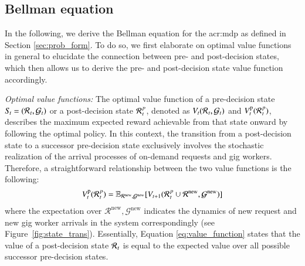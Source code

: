 \subsection{Bellman equation}
\label{sec:bellman}
In the following, we derive the Bellman equation for the \gls{acr:mdp} as defined in Section \ref{sec:prob_form}. To do so, we first elaborate on optimal value functions in general to elucidate the connection between pre- and post-decision states, which then allows us to derive the pre- and post-decision state value function accordingly. 

\noindent \textit{Optimal value functions:} The optimal value function of a pre-decision state $S\hspace{-0.1em}_t = (\mathcal{R}\hspace{0.05em}_{t},\mathcal{G}_t)$ or a post-decision state $\mathcal{R}\hspace{0.05em}_t^{p}$, denoted as $V_t(\mathcal{R}\hspace{0.05em}_{t},\mathcal{G}_t)$ and $V^{\mathrm{p}}_{t}(\mathcal{R}\hspace{0.05em}_{t}^{p})$, describes the maximum expected reward achievable from that state onward by following the optimal policy. In this context, the transition from a post-decision state to a successor pre-decision state exclusively involves the stochastic realization of the arrival processes of on-demand requests and gig workers. Therefore, a straightforward relationship between the two value functions is the following: 
\begin{align}
V^{\mathrm{p}}_{t}(\mathcal{R}\hspace{0.05em}_t^{p}) = \mathbb{E}_{\mathcal{R}^{\mathrm{new}},\mathcal{G}^{\mathrm{new}}}[V_{t+1}(\mathcal{R}\hspace{0.05em}_t^{p} \cup \mathcal{R}^{\mathrm{new}},\mathcal{G}^{\mathrm{new}})] \label{eq:value_function}
\end{align}
where the expectation over $\mathcal{R}^{\mathrm{new}},\mathcal{G}^{\mathrm{new}}$ indicates the dynamics of new request and new gig worker arrivals in the system correspondingly (see Figure~\ref{fig:state_trans}). Essentially, Equation \ref{eq:value_function} states that the value of a post-decision state $\mathcal{R}\hspace{0.05em}_{t}$ is equal to the expected value over all possible successor pre-decision states. 


